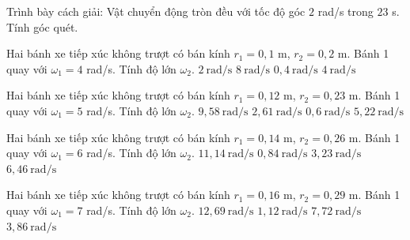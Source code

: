 \begin{bt}
Trình bày cách giải: Vật chuyển động tròn đều với tốc độ góc $2$ rad/s trong $23$ s. Tính góc quét.
\end{bt}

\begin{ex}
Hai bánh xe tiếp xúc không trượt có bán kính $r_1=0,1$ m, $r_2=0,2$ m. Bánh 1 quay với $\omega_1=4$ rad/s. Tính độ lớn $\omega_2$.
\choice
{\True $2\ \mathrm{rad/s}$}
{$8\ \mathrm{rad/s}$}
{$0,4\ \mathrm{rad/s}$}
{$4\ \mathrm{rad/s}$}
\end{ex}

\begin{ex}
Hai bánh xe tiếp xúc không trượt có bán kính $r_1=0,12$ m, $r_2=0,23$ m. Bánh 1 quay với $\omega_1=5$ rad/s. Tính độ lớn $\omega_2$.
\choice
{$9,58\ \mathrm{rad/s}$}
{\True $2,61\ \mathrm{rad/s}$}
{$0,6\ \mathrm{rad/s}$}
{$5,22\ \mathrm{rad/s}$}
\end{ex}

\begin{ex}
Hai bánh xe tiếp xúc không trượt có bán kính $r_1=0,14$ m, $r_2=0,26$ m. Bánh 1 quay với $\omega_1=6$ rad/s. Tính độ lớn $\omega_2$.
\choice
{$11,14\ \mathrm{rad/s}$}
{$0,84\ \mathrm{rad/s}$}
{\True $3,23\ \mathrm{rad/s}$}
{$6,46\ \mathrm{rad/s}$}
\end{ex}

\begin{ex}
Hai bánh xe tiếp xúc không trượt có bán kính $r_1=0,16$ m, $r_2=0,29$ m. Bánh 1 quay với $\omega_1=7$ rad/s. Tính độ lớn $\omega_2$.
\choice
{$12,69\ \mathrm{rad/s}$}
{$1,12\ \mathrm{rad/s}$}
{$7,72\ \mathrm{rad/s}$}
{\True $3,86\ \mathrm{rad/s}$}
\end{ex}


